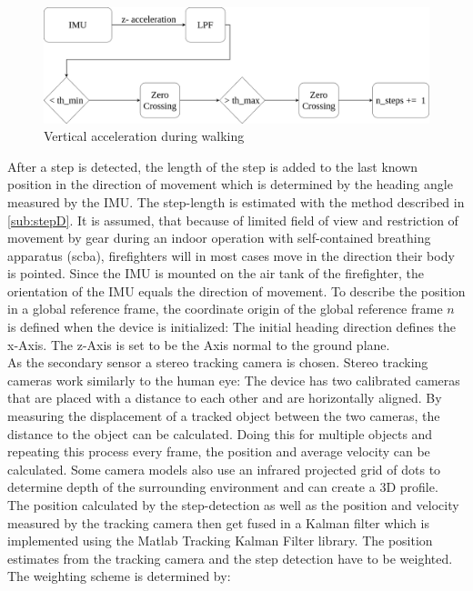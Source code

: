 \documentclass[engproc,conferenceproceedings,submit,pdftex,moreauthors]{Definitions/mdpi}
\begin{document}
\begin{figure}[h!]
	\centering
	\includegraphics[width=\textwidth]{algorithmStepDetect.png}
	
	\caption{Vertical acceleration during walking}
	\label{fig:algorithmStedDetect}
\end{figure}
After a step is detected, the length of the step is added to the last known position in the direction of movement which is determined by the heading angle measured by the IMU. The step-length is estimated with the method described in \ref{sub:stepD}. It is assumed, that because of limited field of view and restriction of movement by gear during an indoor operation with self-contained breathing apparatus (scba), firefighters will in most cases move in the direction their body is pointed. Since the IMU is mounted on the air tank of the firefighter, the orientation of the IMU equals the direction of movement. To describe the position in a global reference frame, the coordinate origin of the global reference frame $n$ is defined when the device is initialized: The initial heading direction defines the x-Axis. The z-Axis is set to be the Axis normal to the ground plane. \\


As the secondary sensor a stereo tracking camera is chosen. Stereo tracking cameras work similarly to the human eye: The device has two calibrated cameras that are placed with a distance to each other and are horizontally aligned. By measuring the displacement of a tracked object between the two cameras, the distance to the object can be calculated. 
Doing this for multiple objects and repeating this process every frame, the position and average velocity can be calculated. 
Some camera models also use an infrared projected grid of dots to determine depth of the surrounding environment and can create a 3D profile.\\


The position calculated by the step-detection as well as the position and velocity measured by the tracking camera then get fused in a Kalman filter which is implemented using the Matlab Tracking Kalman Filter library.
The position estimates from the tracking camera and the step detection have to be weighted. The weighting scheme is determined by:
\end{document}
